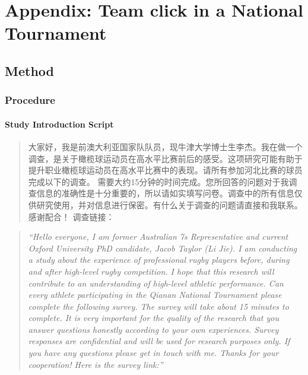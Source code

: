 \chapter{Appendix: Team click in a National Tournament\label{app8:tournamentSurvey}}



                                      \begin{CJK}{UTF8}{gbsn}










\section{Method\label{app8:method}}



\subsection{Procedure\label{app8:procedure}}


\subsubsection{Study Introduction Script\label{app8:studyIntro}}

\begin{CJK}{UTF8}{gbsn}
  \begin{quote}
    大家好，我是前澳大利亚国家队队员，现牛津大学博士生李杰。我在做一个调查，是关于橄榄球运动员在高水平比赛前后的感受。这项研究可能有助于提升职业橄榄球运动员在高水平比赛中的表现。请所有参加河北比赛的球员完成以下的调查。
    需要大约15分钟的时间完成。您所回答的问题对于我调查信息的准确性是十分重要的，所以请如实填写问卷。调查中的所有信息仅供研究使用，并对信息进行保密。有什么关于调查的问题请直接和我联系。感谢配合！ 调查链接：
  \end{quote}
\end{CJK}

\begin{quote}
      \textit{``Hello everyone, I am former Australian 7s Representative and current Oxford University PhD candidate, Jacob Taylor (Li Jie). I am conducting a study about the experience of professional rugby players before, during and after high-level rugby competition. I hope that this research will contribute to an understanding of high-level athletic performance. Can every athlete participating in the Qianan National Tournament please complete the following survey. The survey will take about 15 minutes to complete. It is very important for the quality of the research that you answer questions honestly according to your own experiences. Survey responses are confidential and will be used for research purposes only. If you have any questions please get in touch with me. Thanks for your cooperation! Here is the survey link:''}
\end{quote}





\end{CJK}
